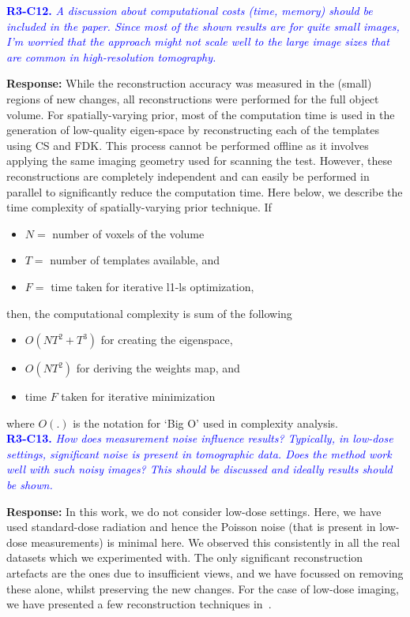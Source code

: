 \documentclass{article}
\begin{document}
\textcolor{blue}{\textbf{R3-C12.}\textit{ A discussion about computational costs (time, memory) should be included in the paper. Since most of the shown results are for quite small images, I'm worried that the approach might not scale well to the large image sizes that are common in high-resolution tomography.   }}

\textbf{Response:} While the reconstruction accuracy was measured in
the (small) regions of new changes, all reconstructions were performed
for the full object volume. For spatially-varying prior, most of the
computation time is used in the generation of low-quality eigen-space
by reconstructing each of the templates using CS and FDK. This process
cannot be performed offline as it involves applying the same imaging
geometry used for scanning the test. However, these reconstructions
are completely independent and can easily be performed in parallel to
significantly reduce the computation time. Here below, we describe the
time complexity of spatially-varying prior technique.  If
\begin{itemize}
\item $N =$ number of voxels of the volume
\item $T =$ number of templates available, and
\item $F =$ time taken for iterative l1-ls optimization,
\end{itemize}
then, the computational complexity is sum of the following
\begin{itemize}
\item $O(NT^2+T^3)$ for creating the eigenspace,
\item $O(NT^2)$ for deriving the weights map, and
\item time $F$  taken for iterative minimization
\end{itemize}
where $O(.)$ is the notation for `Big O' used in complexity analysis.\\


\textcolor{blue}{\textbf{R3-C13.}\textit{ How does measurement noise influence results? Typically, in low-dose settings, significant noise is present in tomographic data. Does the method work well with such noisy images? This should be discussed and ideally results should be shown.}}

\textbf{Response:} In this work, we do not consider low-dose settings. Here, we have used standard-dose radiation and hence the Poisson noise (that is present in low-dose measurements) is minimal here. We observed this consistently in all the real datasets which we experimented with. The only significant reconstruction artefacts are the ones due to insufficient views, and we have focussed on removing these alone, whilst preserving the new changes.
For the case of low-dose imaging, we have presented a few reconstruction techniques in~\cite{gopal2019low}.\\
\end{document}
